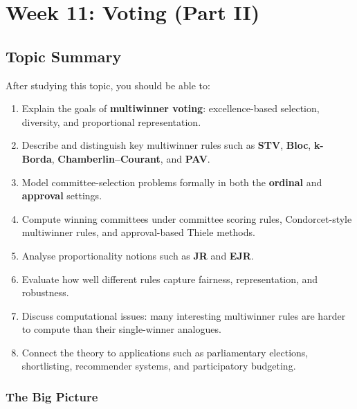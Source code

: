 \section{Week 11: Voting (Part II)}

\subsection{Topic Summary}

\begin{keybox}
After studying this topic, you should be able to:
\begin{enumerate}
  \item Explain the goals of \textbf{multiwinner voting}: excellence-based selection, diversity, and proportional representation.
  \item Describe and distinguish key multiwinner rules such as \textbf{STV}, \textbf{Bloc}, \textbf{k-Borda}, \textbf{Chamberlin--Courant}, and \textbf{PAV}.
  \item Model committee-selection problems formally in both the \textbf{ordinal} and \textbf{approval} settings.
  \item Compute winning committees under committee scoring rules, Condorcet-style multiwinner rules, and approval-based Thiele methods.
  \item Analyse proportionality notions such as \textbf{JR} and \textbf{EJR}.
  \item Evaluate how well different rules capture fairness, representation, and robustness.
  \item Discuss computational issues: many interesting multiwinner rules are harder to compute than their single-winner analogues.
  \item Connect the theory to applications such as parliamentary elections, shortlisting, recommender systems, and participatory budgeting.
\end{enumerate}
\end{keybox}

\separator

\subsubsection*{The Big Picture}

